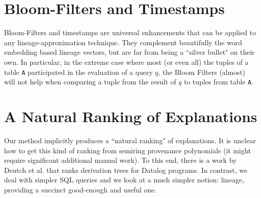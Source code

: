 \section{Bloom-Filters and Timestamps} Bloom-Filters and timestamps are universal enhancements that can be applied to any lineage-approximation technique. They complement beautifully the word embedding based lineage vectors, but are far from being a ``silver bullet" on their own.
In particular, in the extreme case where most (or even all) the tuples of a table \texttt{A} participated in the evaluation of a query $q$, the Bloom Filters (almost) will not help when comparing a tuple from the result of $q$ to tuples from table \texttt{A}.

\section{A Natural Ranking of Explanations}
Our method implicitly produces a ``natural ranking" of explanations. It is unclear how to get this kind of ranking from semiring provenance polynomials (it might require significant additional manual work). To this end, there is a work by Deutch et al. \cite{Deutch2015} that ranks derivation trees for Datalog programs. In contrast, we deal with simpler SQL queries and we look at a much simpler notion: lineage, providing a succinct good-enough and useful one.